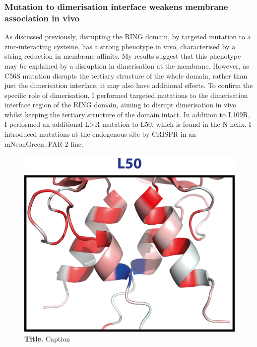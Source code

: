 \documentclass[12pt]{"article"}
\newcommand{\mycaption}[2]{\caption[#1]{\textbf{#1.} #2}}
\begin{document}

\clearpage
\subsubsection{Mutation to dimerisation interface weakens membrane association in vivo}

As discussed previously, disrupting the RING domain, by targeted mutation to a zinc-interacting cysteine, has a strong phenotype in vivo, characterised by a string reduction in membrane affinity. My results suggest that this phenotype may be explained by a disruption in dimerisation at the membrane. However, as C56S mutation disrupts the tertiary structure of the whole domain, rather than just the dimerisation interface, it may also have additional effects. To confirm the specific role of dimerisation, I performed targeted mutations to the dimerisation interface region of the RING domain, aiming to disrupt dimerisation in vivo whilst keeping the tertiary structure of the domain intact. In addition to L109R, I performed an additional L>R mutation to L50, which is found in the N-helix. I introduced mutations at the endogenous site by CRISPR in an mNeonGreen::PAR-2 line. \\

\begin{figure}[!h]
\includegraphics[scale=0.9]{l50_structure}
\setlength{\abovecaptionskip}{20pt}
\centering
\mycaption{Title}{Caption}
\label{fig:l50_structure}
\end{figure}
\end{document}
